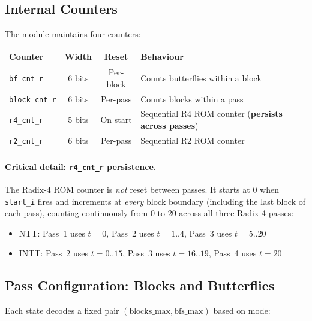 \documentclass[11pt,a4paper]{article}
\newcommand{\sv}[1]{\texttt{#1}}
\newcommand{\port}[1]{\texttt{#1}}
\begin{document}
\subsection{Internal Counters}

The module maintains four counters:

\begin{center}
\renewcommand{\arraystretch}{1.3}
\begin{tabular}{lccl}
  \toprule
  \textbf{Counter} & \textbf{Width} & \textbf{Reset} & \textbf{Behaviour} \\
  \midrule
  \sv{bf\_cnt\_r}    & 6 bits & Per-block  & Counts butterflies within a block \\
  \sv{block\_cnt\_r} & 6 bits & Per-pass   & Counts blocks within a pass \\
  \sv{r4\_cnt\_r}    & 5 bits & On start   & Sequential R4 ROM counter (\textbf{persists across passes}) \\
  \sv{r2\_cnt\_r}    & 6 bits & Per-pass   & Sequential R2 ROM counter \\
  \bottomrule
\end{tabular}
\end{center}

\paragraph{Critical detail: \sv{r4\_cnt\_r} persistence.}
The Radix-4 ROM counter is \emph{not} reset between passes. It starts at 0 when \port{start\_i} fires and increments at \emph{every} block boundary (including the last block of each pass), counting continuously from 0 to 20 across all three Radix-4 passes:
\begin{itemize}
  \item NTT: Pass~1 uses $t=0$, Pass~2 uses $t=1..4$, Pass~3 uses $t=5..20$
  \item INTT: Pass~2 uses $t=0..15$, Pass~3 uses $t=16..19$, Pass~4 uses $t=20$
\end{itemize}

\subsection{Pass Configuration: Blocks and Butterflies}

Each state decodes a fixed pair $(\text{blocks\_max}, \text{bfs\_max})$ based on mode:
\end{document}
